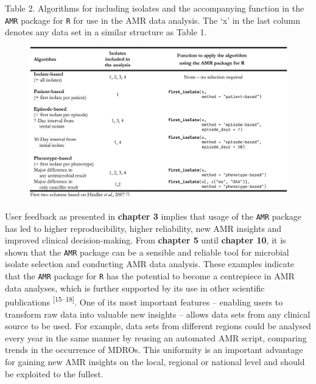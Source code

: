 \documentclass[
]{book}
\begin{document}
Table 2. Algorithms for including isolates and the accompanying function in the \texttt{AMR} package for \texttt{R} for use in the AMR data analysis. The `x' in the last column denotes any data set in a similar structure as Table 1.

\begin{figure}

{\centering \includegraphics[width=1\linewidth]{images/11-t02} 

}

\end{figure}

User feedback as presented in \textbf{chapter 3} implies that usage of the \texttt{AMR} package has led to higher reproducibility, higher reliability, new AMR insights and improved clinical decision-making. From \textbf{chapter 5} until \textbf{chapter 10}, it is shown that the \texttt{AMR} package can be a sensible and reliable tool for microbial isolate selection and conducting AMR data analysis. These examples indicate that the \texttt{AMR} package for \texttt{R} has the potential to become a centrepiece in AMR data analyses, which is further supported by its use in other scientific publications \textsuperscript{{[}15--18{]}}. One of its most important features -- enabling users to transform raw data into valuable new insights -- allows data sets from any clinical source to be used. For example, data sets from different regions could be analysed every year in the same manner by reusing an automated AMR script, comparing trends in the occurrence of MDROs. This uniformity is an important advantage for gaining new AMR insights on the local, regional or national level and should be exploited to the fullest.
\end{document}
